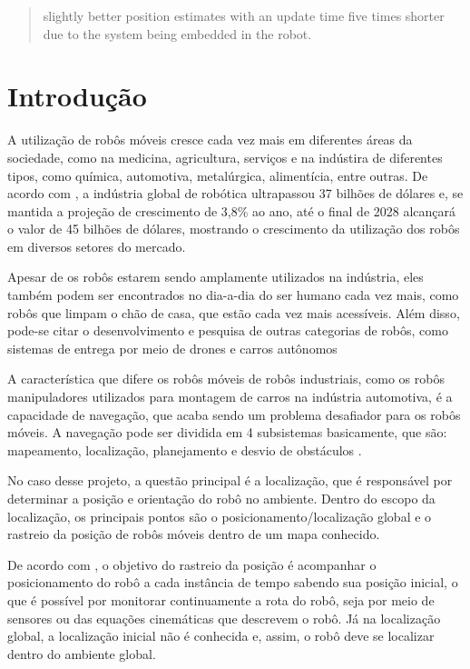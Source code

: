 \documentclass[acronym, symbols, table]{fei}
\begin{document}
\begin{abstract}
slightly better position estimates with an update time five times shorter due to the system being embedded in the robot.
	
	
\end{abstract}

\listoffigures
\listoftables
\listofalgorithms
\printglossary[type=\acronymtype]
\tableofcontents
\setcounter{table}{0}

\chapter{Introdução}

	A utilização de robôs móveis cresce cada vez mais em diferentes áreas da sociedade, como na medicina, agricultura, serviços e na indústira de diferentes tipos, como química, automotiva, metalúrgica, alimentícia, entre outras. De acordo com \textcite{robotics_market}, a indústria global de robótica ultrapassou 37 bilhões de dólares e, se mantida a projeção de crescimento de 3,8\% ao ano, até o final de 2028 alcançará o valor de 45 bilhões de dólares, mostrando o crescimento da utilização dos robôs em diversos setores do mercado.
	
	Apesar de os robôs estarem sendo amplamente utilizados na indústria, eles também podem ser encontrados no dia-a-dia do ser humano cada vez mais, como robôs que limpam o chão de casa, que estão cada vez mais acessíveis. Além disso, pode-se citar o desenvolvimento e pesquisa de outras categorias de robôs, como sistemas de entrega por meio de drones \cite{su14010360} e carros autônomos \cite{parekh2022review}
	
	A característica que difere os robôs móveis de robôs industriais, como os robôs manipuladores utilizados para montagem de carros na indústria automotiva, é a capacidade de navegação, que acaba sendo um problema desafiador para os robôs móveis. A navegação pode ser dividida em 4 subsistemas basicamente, que são: mapeamento, localização, planejamento e desvio de obstáculos \cite{app12146951}. 
	
	No caso desse projeto, a questão principal é a localização, que é responsável por determinar a posição e orientação do robô no ambiente. Dentro do escopo da localização, os principais pontos são o posicionamento/localização global e o rastreio da posição de robôs móveis dentro de um mapa conhecido.
	
	De acordo com \textcite{PANIGRAHI20226019}, o objetivo do rastreio da posição é acompanhar o posicionamento do robô a cada instância de tempo sabendo sua posição inicial, o que é possível por monitorar continuamente a rota do robô, seja por meio de sensores ou das equações cinemáticas que descrevem o robô. Já na localização global, a localização inicial não é conhecida e, assim, o robô deve se localizar dentro do ambiente global.
	
\end{document}
